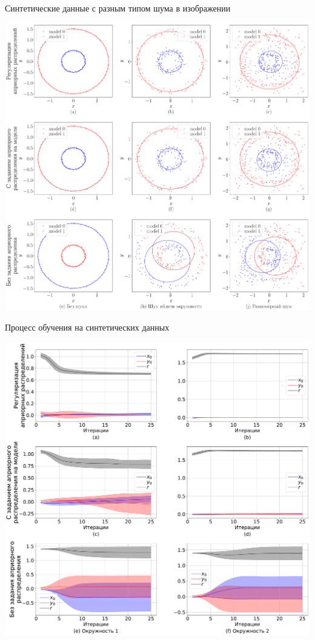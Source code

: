 \documentclass[9pt,pdf,hyperref={unicode}]{beamer}
\begin{document}
\begin{frame}{Синтетические данные с разным типом шума в изображении}
\justifying
\begin{center}
	\includegraphics[height=0.9\textheight]{result/experiment_synthetic}
\end{center}

\end{frame}
\begin{frame}{Процесс обучения на синтетических данных}
\justifying
\begin{center}
	\includegraphics[height=0.9\textheight]{result/experiment_synthetic_param_progress}
\end{center}

\end{frame}
\end{document}
